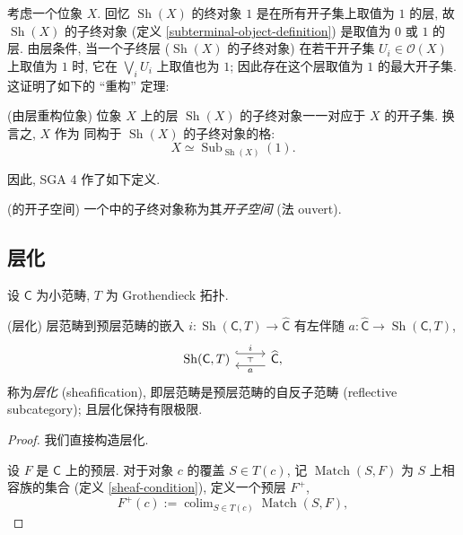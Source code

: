 考虑一个位象 $X$. 回忆 $\operatorname{Sh}(X)$ 的终对象 $1$ 是在所有开子集上取值为 $1$ 的层, 故 $\operatorname{Sh}(X)$ 的子终对象 (定义 \ref{subterminal-object-definition}) 是取值为 $0$ 或 $1$ 的层. 由层条件, 当一个子终层 ($\operatorname{Sh}(X)$ 的子终对象) 在若干开子集 $U_i\in\mathcal O(X)$ 上取值为 $1$ 时, 它在 $\bigvee_i U_i$ 上取值也为 $1$; 因此存在这个层取值为 $1$ 的最大开子集. 这证明了如下的 ``重构'' 定理:

\begin{prop}
	{(由层\topos{}重构位象)}
	位象 $X$ 上的层\topos{} $\operatorname{Sh}(X)$ 的子终对象一一对应于 $X$ 的开子集. 换言之, $X$ 作为\fm{} 同构于 $\operatorname{Sh}(X)$ 的子终对象的格:
	$$
	X \simeq \operatorname{Sub}_{\operatorname{Sh}(X)}(1).
	$$
\end{prop}

因此, SGA 4 \cite{SGA4} 作了如下定义.

\begin{definition}
	[label={ouvert}]
	{(\topos{}的开子空间)}
	一个\topos{}中的子终对象称为其\emph{开子空间} (法 ouvert).
\end{definition}

\subsection{层化}

设 $\mathsf C$ 为小范畴, $T$ 为 Grothendieck 拓扑.

\begin{prop}
	[label={sheafification}]
    {(层化)}
    层范畴到预层范畴的嵌入 $i\colon \operatorname{Sh}(\mathsf C,T)\to \widehat {\mathsf C}$ 有左伴随 $a\colon \widehat {\mathsf C}\to\operatorname{Sh}(\mathsf C,T)$,
\[\begin{tikzcd}[ampersand replacement=\&]
	{\operatorname{Sh}(\mathsf C,T)} \& {\widehat {\mathsf C},}
	\arrow[""{name=0, anchor=center, inner sep=0}, "a", shift left=2, from=1-2, to=1-1]
	\arrow[""{name=1, anchor=center, inner sep=0}, "i", shift left=2, hook, from=1-1, to=1-2]
	\arrow["\dashv"{anchor=center, rotate=90}, draw=none, from=0, to=1]
\end{tikzcd}\]
    称为\emph{层化} (sheafification),
    即层范畴是预层范畴的自反子范畴 (reflective subcategory);
    且层化保持有限极限.
\end{prop}

\begin{proof}
    我们直接构造层化.
    
    设 $F$ 是 $\mathsf C$ 上的预层.
    对于对象 $c$ 的覆盖 $S \in T(c)$,
    记 $\operatorname{Match}(S,F)$
    为 $S$ 上相容族的集合 (定义 \ref{sheaf-condition}),
    定义一个预层 $F^+$,
    $$
    F^+(c):=\operatorname{colim}_{S\in T(c)}\operatorname{Match}(S,F),
    $$
\end{proof}

